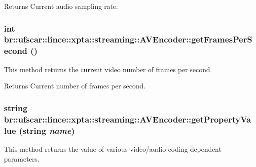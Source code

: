 \begin{DoxyReturn}{Returns}
Current audio sampling rate. 
\end{DoxyReturn}
\hypertarget{classbr_1_1ufscar_1_1lince_1_1xpta_1_1streaming_1_1AVEncoder_acca482f1651fe26c47bb267ee4b49985}{
\subsubsection[{getFramesPerSecond}]{\setlength{\rightskip}{0pt plus 5cm}int br::ufscar::lince::xpta::streaming::AVEncoder::getFramesPerSecond ()}}
\label{classbr_1_1ufscar_1_1lince_1_1xpta_1_1streaming_1_1AVEncoder_acca482f1651fe26c47bb267ee4b49985}


This method returns the current video number of frames per second. 

\begin{DoxyReturn}{Returns}
Current number of frames per second. 
\end{DoxyReturn}
\hypertarget{classbr_1_1ufscar_1_1lince_1_1xpta_1_1streaming_1_1AVEncoder_a6b126762cca6defb9a4ad23aef22c883}{
\subsubsection[{getPropertyValue}]{\setlength{\rightskip}{0pt plus 5cm}string br::ufscar::lince::xpta::streaming::AVEncoder::getPropertyValue (string {\em name})}}
\label{classbr_1_1ufscar_1_1lince_1_1xpta_1_1streaming_1_1AVEncoder_a6b126762cca6defb9a4ad23aef22c883}


This method returns the value of various video/audio coding dependent parameters. 


